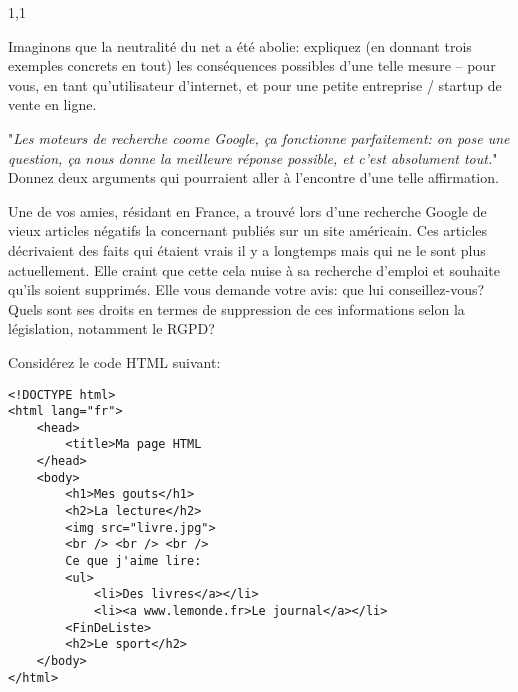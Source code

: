 \documentclass[11pt,a4paper]{exam}
\begin{document}
\begin{spacing}{1,1}
\begin{questions}
        	\question[2] Imaginons que la neutralité du net a été abolie: expliquez (en donnant trois exemples concrets en tout) les conséquences possibles d'une telle mesure -- pour vous, en tant qu'utilisateur d'internet, et pour une petite entreprise / startup de vente en ligne.
        	
        	\question[2] "\textit{Les moteurs de recherche coome Google, ça fonctionne parfaitement: on pose une question, ça nous donne la meilleure réponse possible, et c'est absolument tout.}" Donnez deux arguments qui pourraient aller à l'encontre d'une telle affirmation.
        	
        	\question[2] Une de vos amies, résidant en France, a trouvé lors d'une recherche Google de vieux articles négatifs la concernant publiés sur un site américain. Ces articles décrivaient des faits qui étaient vrais il y a longtemps mais qui ne le sont plus actuellement. Elle craint que cette cela nuise à sa recherche d'emploi et souhaite qu'ils soient supprimés. Elle vous demande votre avis: que lui conseillez-vous? Quels sont ses droits en termes de suppression de ces informations selon la législation, notamment le RGPD?
        	
        	\question Considérez le code HTML suivant:
        	\begin{verbatim}
<!DOCTYPE html>
<html lang="fr">
    <head>
        <title>Ma page HTML
    </head>
    <body>
        <h1>Mes gouts</h1>
        <h2>La lecture</h2>
        <img src="livre.jpg">
        <br /> <br /> <br />
        Ce que j'aime lire:
        <ul>
            <li>Des livres</a></li>
            <li><a www.lemonde.fr>Le journal</a></li>
        <FinDeListe>
        <h2>Le sport</h2>
    </body>
</html>
        	\end{verbatim}
        		

\end{questions}
\end{spacing}
\end{document}
